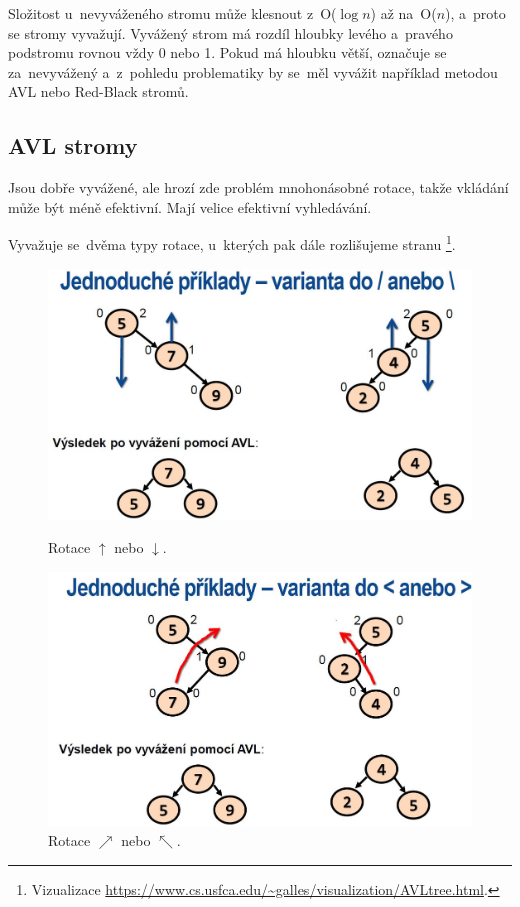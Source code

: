Složitost u~nevyváženého stromu může klesnout z~O($\log{n}$) až na~O($n$), a~proto se stromy vyvažují. Vyvážený strom má rozdíl hloubky levého a~pravého podstromu rovnou vždy 0 nebo 1. Pokud má hloubku větší, označuje se za~nevyvážený a~z~pohledu problematiky by se~měl vyvážit například metodou AVL nebo Red-Black stromů.

\subsection{AVL stromy}

Jsou dobře vyvážené, ale hrozí zde problém mnohonásobné rotace, takže vkládání může být méně efektivní. Mají velice efektivní vyhledávání.

Vyvažuje se~dvěma typy rotace, u~kterých pak dále rozlišujeme stranu%
\footnote{Vizualizace \url{https://www.cs.usfca.edu/~galles/visualization/AVLtree.html}.}.

\begin{figure}[ht]
	\begin{minipage}[b]{0.47\textwidth}
		\includegraphics[width=\textwidth]{images/Rotation1Type.JPG}
		\caption{Rotace $\uparrow$ nebo $\downarrow$.}
	\end{minipage}
	\hspace*{1em}%
	\begin{minipage}[b]{0.47\textwidth}
		\includegraphics[width=\textwidth]{images/Rotation2Type.JPG}
		\caption{Rotace $\nearrow$ nebo $\nwarrow$.}
	\end{minipage}
\end{figure}

